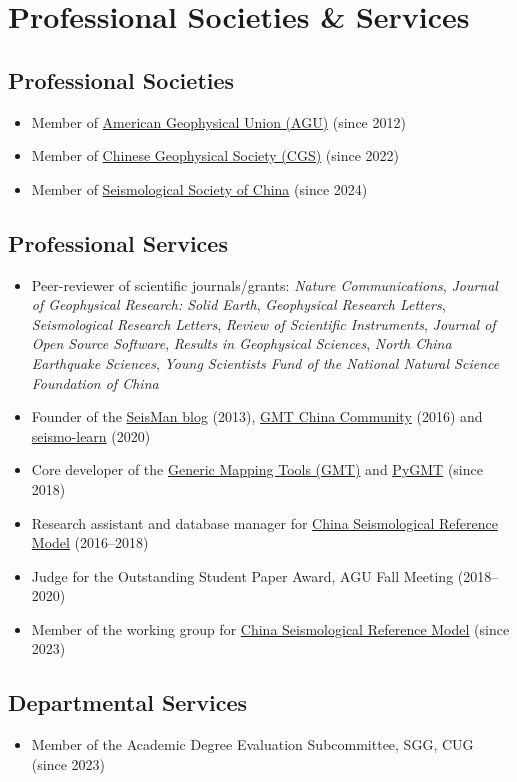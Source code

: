 \section{Professional Societies \& Services}

\subsection{Professional Societies}
\begin{itemize}
\item Member of \href{https://sites.agu.org/}{American Geophysical Union (AGU)} (since 2012)
\item Member of \href{http://www.cgscgs.org.cn/}{Chinese Geophysical Society (CGS)} (since 2022)
\item Member of \href{https://www.ssoc.org.cn/}{Seismological Society of China} (since 2024)
\end{itemize}

\subsection{Professional Services}
\begin{itemize}
\item Peer-reviewer of scientific journals/grants:
      \emph{Nature Communications},
      \emph{Journal of Geophysical Research: Solid Earth},
      \emph{Geophysical Research Letters},
      \emph{Seismological Research Letters},
      \emph{Review of Scientific Instruments},
      \emph{Journal of Open Source Software},
      \emph{Results in Geophysical Sciences},
      \emph{North China Earthquake Sciences},
      \emph{Young Scientists Fund of the National Natural Science Foundation of China}
\item Founder of the \href{https://blog.seisman.info}{SeisMan blog} (2013),
      \href{http://gmt-china.org/}{GMT China Community} (2016)
      and \href{https://seismo-learn.org/}{seismo-learn} (2020)
\item Core developer of the \href{https://github.com/GenericMappingTools/gmt}{Generic Mapping Tools (GMT)} and
      \href{https://github.com/GenericMappingTools/pygmt}{PyGMT} (since 2018)
\item Research assistant and database manager for \href{http://chinageorefmodel.org/}{China Seismological Reference Model} (2016--2018)
\item Judge for the Outstanding Student Paper Award, AGU Fall Meeting (2018--2020)
\item Member of the working group for \href{http://chinageorefmodel.org/}{China Seismological Reference Model} (since 2023)
\end{itemize}

\subsection{Departmental Services}
\begin{itemize}
\item Member of the Academic Degree Evaluation Subcommittee, SGG, CUG (since 2023)
\end{itemize}
